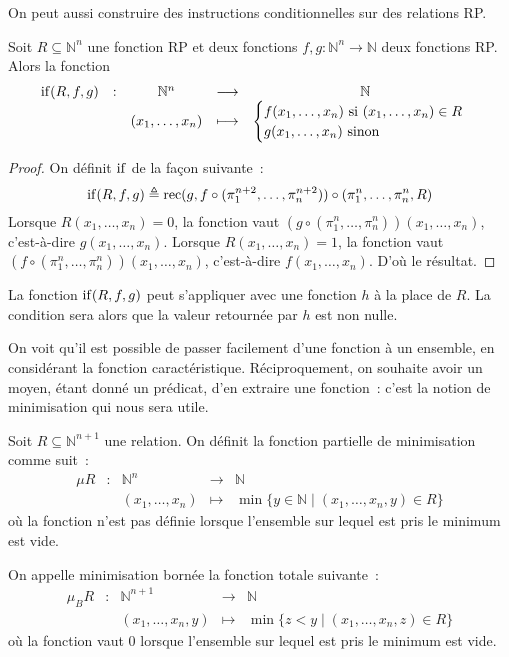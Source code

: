 On peut aussi construire des instructions conditionnelles sur des relations RP.

\begin{proposition}
  Soit $R \subseteq \mathbb N^n$ une fonction RP et deux fonctions
  $f,g : \mathbb N^n \to \mathbb N$ deux fonctions RP. Alors la fonction
  \[\begin{array}{ccccc}
  \operatorname{if}(R,f,g)& : & \mathbb N^n &\longrightarrow & \mathbb N\\
  & & (x_1,\ldots,x_n) &\longmapsto &
  \begin{cases}
    f(x_1,\ldots,x_n) \text{ si } (x_1,\ldots,x_n) \in R\\
    g(x_1,\ldots,x_n) \text{ sinon }
  \end{cases}
  \end{array}\]
\end{proposition}

\begin{proof}
  On définit $\operatorname{if}$ de la façon suivante~:
  \[\operatorname{if}(R,f,g) \triangleq \operatorname{rec}(g,f\circ(\pi_1^{n+2},\ldots,\pi_n^{n+2}))\circ
  (\pi_1^n,\ldots,\pi_n^n,R)\]
  Lorsque $R(x_1,\ldots,x_n) = 0$, la fonction vaut
  $(g\circ (\pi_1^n,\ldots,\pi_n^n)) (x_1,\ldots,x_n)$, c'est-à-dire
  $g(x_1,\ldots,x_n)$. Lorsque $R(x_1,\ldots,x_n) = 1$, la fonction
  vaut $(f\circ (\pi_1^n,\ldots,\pi_n^n))(x_1,\ldots,x_n)$, c'est-à-dire
  $f(x_1,\ldots,x_n)$. D'où le résultat.
\end{proof}

\begin{remark}
  La fonction $\operatorname{if}(R,f,g)$ peut s'appliquer avec une fonction $h$ à la place
  de $R$. La condition sera alors que la valeur retournée par $h$ est non nulle.
\end{remark}

On voit qu'il est possible de passer facilement d'une fonction à un ensemble,
en considérant la fonction caractéristique. Réciproquement, on souhaite avoir
un moyen, étant donné un prédicat, d'en extraire une fonction~: c'est la notion
de minimisation qui nous sera utile.

\begin{definition}
  Soit $R \subseteq \mathbb N^{n+1}$ une relation. On définit la fonction
  partielle de minimisation comme suit~:
  \[\begin{array}{ccccc}
  \mu R & : & \mathbb N^n & \longrightarrow & \mathbb N\\
  & & (x_1,\ldots,x_n) & \longmapsto & \min
  \{ y \in \mathbb N\mid (x_1,\ldots,x_n,y)\in R\}
  \end{array}\]
  où la fonction n'est pas définie lorsque l'ensemble sur lequel est pris le
  minimum est vide.

  On appelle minimisation bornée la fonction totale suivante~:
  \[\begin{array}{ccccc}
  \mu_B R & : & \mathbb N^{n+1} & \longrightarrow &\mathbb N\\
  & & (x_1,\ldots,x_n,y) & \longmapsto & \min
  \{ z < y \mid (x_1,\ldots,x_n,z) \in R\}
  \end{array}\]
  où la fonction vaut $0$ lorsque l'ensemble sur lequel est pris le minimum est
  vide.
\end{definition}

